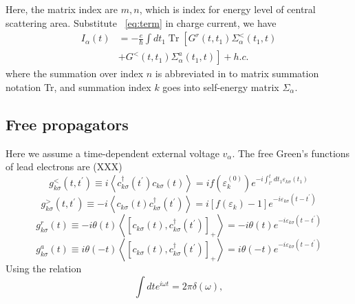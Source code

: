 \documentclass[aps,prb,superscriptaddress]{revtex4-2}
\begin{document}
Here, the matrix index are $m, n$, which is index for energy level of central scattering area. Substitute ~\ref{eq:term} in charge current, we have
\begin{equation}
\begin{aligned}
I_{\alpha}(t) &=-\frac{e}{\hbar} \int d t_{1} \operatorname{Tr}\left[G^{r}\left(t, t_{1}\right) \Sigma_{\alpha}^{<}\left(t_{1}, t\right)\right.\\
&\left.+G^{<}\left(t, t_{1}\right) \Sigma_{\alpha}^{a}\left(t_{1}, t\right)\right]+h . c .
\end{aligned}
\end{equation}
where the summation over index $n$ is abbreviated in to matrix summation notation Tr, and summation index $k$ goes into self-energy matrix $\Sigma_{\alpha}$.
\subsection{Free propagators}
Here we assume a time-dependent external voltage $v_{\alpha}$. The free Green's functions of lead electrons are (XXX)
\begin{equation}
g_{k \sigma}^{<}\left(t, t^{\prime}\right) \equiv i\left\langle c_{k \sigma}^{\dagger}\left(t^{\prime}\right) c_{k \sigma}(t)\right\rangle=i f(\varepsilon_{k}^{(0)}) e^{-i \int_{t'}^{t}dt_{1}\varepsilon_{k\sigma}(t_{1})}
\end{equation}
\begin{equation}
g_{k \sigma}^{>}\left(t, t^{\prime}\right) \equiv-i\left\langle c_{k \sigma}(t) c_{k \sigma}^{\dagger}\left(t^{\prime}\right)\right\rangle=i\left[f\left(\varepsilon_{k}\right)-1\right] e^{-i \varepsilon_{k\sigma}\left(t-t^{\prime}\right)}
\end{equation}
\begin{equation}
g_{k \sigma}^{r}(t) \equiv-i \theta(t)\left\langle\left[c_{k \sigma}(t), c_{k \sigma}^{\dagger}\left(t^{\prime}\right)\right]_{+}\right\rangle=-i \theta(t) e^{-i \varepsilon_{k\sigma}\left(t-t^{\prime}\right)}
\end{equation}
\begin{equation}
g_{k \sigma}^{a}(t) \equiv i \theta(-t)\left\langle\left[c_{k \sigma}(t), c_{k \sigma}^{\dagger}\left(t^{\prime}\right)\right]_{+}\right\rangle=i \theta(-t) e^{-i \varepsilon_{k\sigma}\left(t-t^{\prime}\right)}
\end{equation}
Using the relation
\begin{equation}
\int d t e^{i \omega t}=2 \pi \delta(\omega),
\end{equation}
\end{document}
